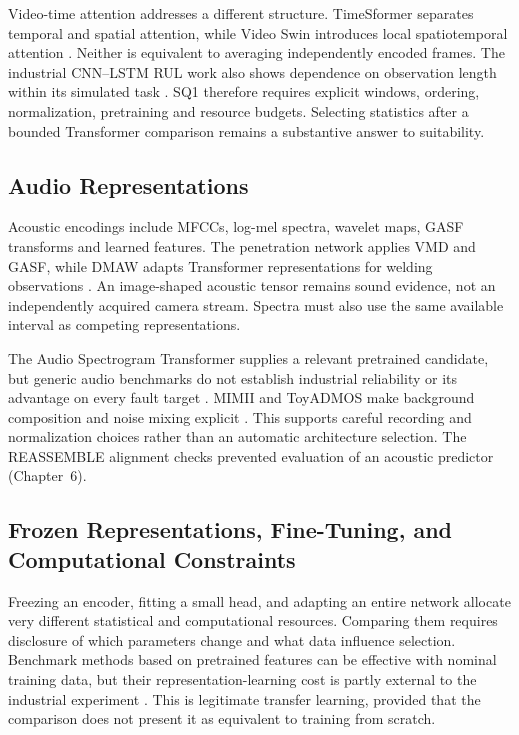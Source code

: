 Video-time attention addresses a different structure. TimeSformer separates temporal and spatial attention, while Video Swin introduces local spatiotemporal attention \citep{P034,P013}. Neither is equivalent to averaging independently encoded frames. The industrial CNN--LSTM RUL work also shows dependence on observation length within its simulated task \citep{AlDulaimi2019A}. SQ1 therefore requires explicit windows, ordering, normalization, pretraining and resource budgets. Selecting statistics after a bounded Transformer comparison remains a substantive answer to suitability.

\subsection{Audio Representations}
Acoustic encodings include MFCCs, log-mel spectra, wavelet maps, GASF transforms and learned features. The penetration network applies VMD and GASF, while DMAW adapts Transformer representations for welding observations \citep{Hua2026Weld,P003}. An image-shaped acoustic tensor remains sound evidence, not an independently acquired camera stream. Spectra must also use the same available interval as competing representations.

The Audio Spectrogram Transformer supplies a relevant pretrained candidate, but generic audio benchmarks do not establish industrial reliability or its advantage on every fault target \citep{P011}. MIMII and ToyADMOS make background composition and noise mixing explicit \citep{Purohit2019MIMII,Koizumi2019ToyADMOS}. This supports careful recording and normalization choices rather than an automatic architecture selection. The REASSEMBLE alignment checks prevented evaluation of an acoustic predictor (Chapter~6).

\subsection{Frozen Representations, Fine-Tuning, and Computational Constraints}

Freezing an encoder, fitting a small head, and adapting an entire network allocate very different statistical and computational resources. Comparing them requires disclosure of which parameters change and what data influence selection. Benchmark methods based on pretrained features can be effective with nominal training data, but their representation-learning cost is partly external to the industrial experiment \citep{Roth2022Towards,Costanzino2024Multimodal}. This is legitimate transfer learning, provided that the comparison does not present it as equivalent to training from scratch.

